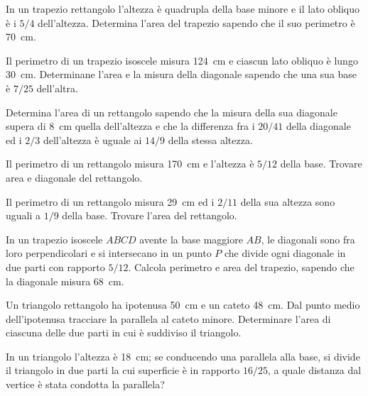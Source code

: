 \begin{multicols}{2}
\begin{esercizio}
\label{ese:7.65}
In un trapezio rettangolo l'altezza è quadrupla della base minore e il lato obliquo è i $5/4$ dell'altezza. Determina l'area del trapezio sapendo che il suo perimetro è 70~cm.
\end{esercizio}

\begin{esercizio}
\label{ese:7.66}
Il perimetro di un trapezio isoscele misura 124~cm e ciascun lato obliquo è lungo 30~cm. Determinane l'area e la misura della diagonale sapendo che una sua base è $7/25$ dell'altra.
\end{esercizio}

\begin{esercizio}
\label{ese:7.67}
Determina l'area di un rettangolo sapendo che la misura della sua diagonale supera di 8~cm quella dell'altezza e che la differenza fra i $20/41$ della diagonale ed i $2/3$ dell'altezza è uguale ai $14/9$ della stessa altezza.
\end{esercizio}

\begin{esercizio}
\label{ese:7.68}
Il perimetro di un rettangolo misura 170~cm e l'altezza è $5/12$ della base. Trovare area e diagonale del rettangolo.
\end{esercizio}

\begin{esercizio}
\label{ese:7.69}
Il perimetro di un rettangolo misura 29~cm ed i $2/11$ della sua altezza sono uguali a $1/9$ della base. Trovare l'area del rettangolo.
\end{esercizio}

\begin{esercizio}
\label{ese:7.70}
In un trapezio isoscele $ABCD$ avente la base maggiore $AB$, le diagonali sono fra loro perpendicolari e si intersecano in un punto $P$ che divide ogni diagonale in due parti con rapporto $5/12$. Calcola perimetro e area del trapezio, sapendo che la diagonale misura 68~cm.
\end{esercizio}

\begin{esercizio}
\label{ese:7.71}
Un triangolo rettangolo ha ipotenusa 50~cm e un cateto 48~cm. Dal punto medio dell'ipotenusa tracciare la parallela al cateto minore. Determinare l'area di ciascuna delle due parti in cui è suddiviso il triangolo.
\end{esercizio}

\begin{esercizio}
\label{ese:7.72}
In un triangolo l'altezza è 18~cm; se conducendo una parallela alla base, si divide il triangolo in due parti la cui superficie è in rapporto $16/25$, a quale distanza dal vertice è stata condotta la parallela?
\end{esercizio}


\end{multicols}
